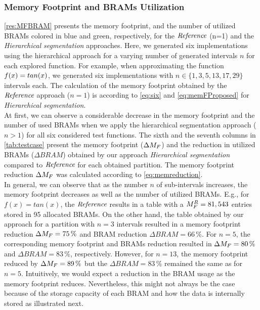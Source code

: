 \subsubsection{Memory Footprint and BRAMs Utilization}
\cref{res:MFBRAM} presents the memory footprint, and the number of utilized BRAMs colored in blue and green, respectively, for the $\textit{Reference}$ (n=1) and the {\textit{Hierarchical segmentation}} approaches.
Here, we generated six implementations using the hierarchical approach {for a} varying number of generated intervals $n$ for each explored function.
For example, when approximating the function $f(x)=tan(x)$, we generated six implementations with $n\in\{1,3,5,13,17,29\}$ {intervals each}.
The calculation of the memory footprint obtained by the $\textit{Reference}$ approach ($n=1$) is according to \cref{eq:six} {and \cref{eq:memFProposed} for \textit{Hierarchical segmentation}.}\\
At first, we can observe a considerable decrease in the memory footprint and the number of used BRAMs when we apply the hierarchical segmentation approach ($n>1$) for all {six considered test} functions.
The sixth and the seventh columns in \cref{tab:testcase} present the memory footprint ({$\Delta M_{F}$}) and the {reduction in utilized} BRAMs ({$\Delta BRAM$}) obtained by our approach \textit{Hierarchical segmentation} compared to $\textit{Reference}$ for each obtained partition.
The memory footprint reduction {$\Delta M_{F}$} was calculated according to \cref{eq:memreduction}.\\
In general, we can observe that as the {number $n$} of sub-intervals increases, the memory footprint decreases as well as the number of utilized BRAMs.
E.g., for $f(x)=tan(x)$, the $\textit{Reference}$ results in a table with a $M_{F}^R=81,543$ entries stored in 95 {allocated} BRAMs.
On the other hand, the table obtained by our approach for {a partition with} $n=3$ {intervals} resulted in a memory footprint reduction ${\Delta M_{F}}=75\,\%$ and BRAM reduction ${\Delta BRAM}=66\,\%$.
For $n=5$, the corresponding memory footprint and BRAMs reduction resulted in ${\Delta M_{F}}=80\,\%$ and ${\Delta BRAM}=83\,\%$, respectively.
However, for $n=13${,} the memory footprint reduced by ${\Delta M_{F}}=89\,\%$ but the ${\Delta BRAM}=83\,\%$ remained the same as {for} $n=5$.
Intuitively, we would expect a reduction in the BRAM usage as the memory footprint reduces.
Nevertheless, this might not always be the case because of the storage capacity of each BRAM and how the data is internally stored {as illustrated next}.\\
